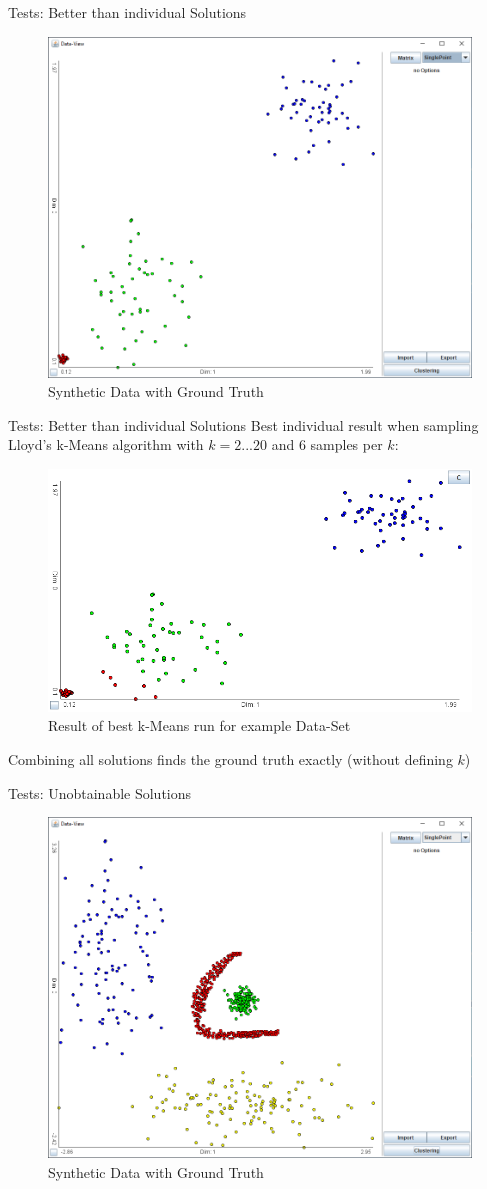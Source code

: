 \documentclass[aspectratio=169]{beamer}
\begin{document}
\begin{frame}{Tests: Better than individual Solutions}
	\begin{figure}[h]
		\centering
		\includegraphics[width=.64\textwidth]{better_base}
		\caption{Synthetic Data with Ground Truth}
		\label{fig:better_base}
	\end{figure}
\end{frame}

\begin{frame}{Tests: Better than individual Solutions}
Best individual result when sampling Lloyd's k-Means algorithm with \newline $k=2...20$ and $6$ samples per $k$:
	\begin{figure}[h]
		\centering
		\includegraphics[width=.64\textwidth]{better_base_best}
		\caption{Result of best k-Means run for example Data-Set}
		\label{fig:better_base_best}
	\end{figure}
Combining all solutions finds the ground truth exactly (without defining $k$)
\end{frame}

\begin{frame}{Tests: Unobtainable Solutions}
	\begin{figure}[h]
		\centering
		\includegraphics[width=.64\textwidth]{unob_fix}
		\caption{Synthetic Data with Ground Truth}
		\label{fig:better_base}
	\end{figure}
\end{frame}
\end{document}
